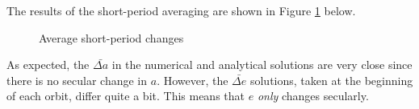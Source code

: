\documentclass[]{aiaa-tc}%
\begin{document}
The results of the short-period averaging are shown in Figure \ref{fig:SimResults} below.
	\begin{figure}[H]
		\centering
	\caption{Average short-period changes }
		\label{fig:SimResults}
	\end{figure}

As expected, the $\bar{\Delta a}$ in the numerical and analytical solutions are very close since there is no secular change in $a$. However, the $\bar{\Delta e}$ solutions, taken at the beginning of each orbit, differ quite a bit. This means that $e$ \textit{only} changes secularly.
	



\end{document}
